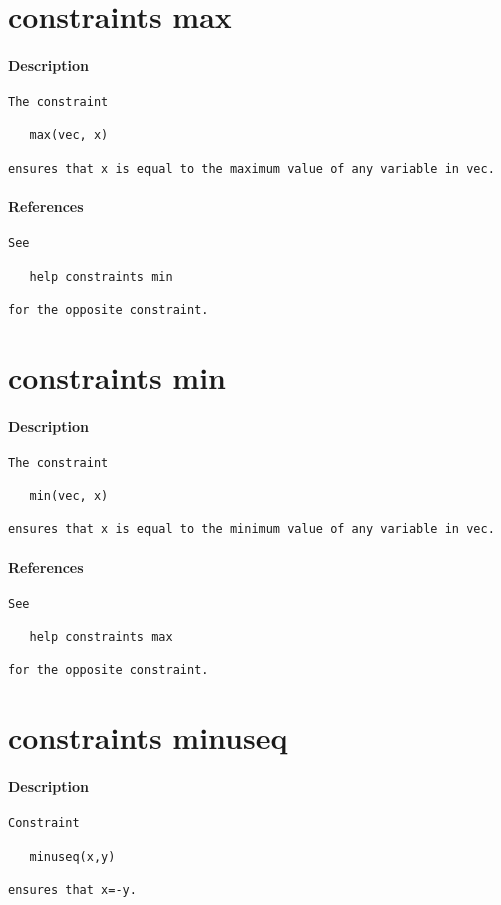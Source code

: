 \section{constraints max}
\paragraph{Description}
{\footnotesize
\begin{verbatim}
The constraint

   max(vec, x)

ensures that x is equal to the maximum value of any variable in vec.
\end{verbatim}
}
\paragraph{References}
{\footnotesize
\begin{verbatim}
See

   help constraints min

for the opposite constraint.
\end{verbatim}
}
\section{constraints min}
\paragraph{Description}
{\footnotesize
\begin{verbatim}
The constraint

   min(vec, x)

ensures that x is equal to the minimum value of any variable in vec.
\end{verbatim}
}
\paragraph{References}
{\footnotesize
\begin{verbatim}
See

   help constraints max

for the opposite constraint.
\end{verbatim}
}
\section{constraints minuseq}
\paragraph{Description}
{\footnotesize
\begin{verbatim}
Constraint

   minuseq(x,y)

ensures that x=-y.
\end{verbatim}
}
